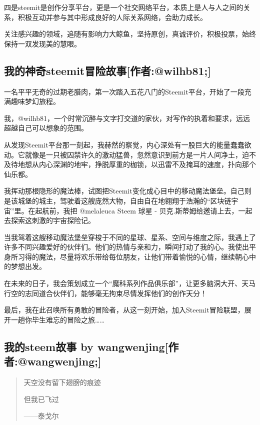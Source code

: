 \documentclass[]{ctexbook}
\begin{document}
四是steemit是创作分享平台，更是一个社交网络平台，本质上是人与人之间的关系，积极互动并参与其中形成良好的人际关系网络，会助力成长。

关注感兴趣的领域，追随有影响力大鲸鱼，坚持原创，真诚评价，积极投票，始终保持一双发现美的慧眼。

\hypertarget{steemitwilhb81}{%
\subsection{我的神奇steemit冒险故事{[}作者:@wilhb81;{]}}\label{steemitwilhb81}}

一名平平无奇的过期老腊肉，第一次踏入五花八门的Steemit平台，开始了一段充满趣味梦幻旅程。

我，@wilhb81，一个时常沉醉与文字打交道的家伙，对写作的执着和要求，远远超越自己可以想象的范围。

从发现Steemit平台那一刻起，我赫然的察觉，内心深处有一股巨大的能量蠢蠢欲动。它就像是一只被囚禁许久的激动猛兽，忽然意识到前方是一片人间净土，迫不及待地想从内心深渊的地牢，挣脱厚重的枷锁，以迅雷不及掩耳的速度，扑向那个仙乐都。

我挥动那根隐形的魔法棒，试图把Steemit变化成心目中的移动魔法堡垒。自己则是该城堡的城主，驾驶着这艘庞然大物，自由自在地翱翔于浩瀚的``区块链宇宙''里。在起航前，我把 @melaleuca Steem 球星 - 贝克.斯蒂姆给邀请上去，一起去探索这刺激的宇宙探险记。

当我驾着这艘移动魔法堡垒穿梭于不同的星球、星系、空间与维度之际，我遇上了许多不同兴趣爱好的伙伴们。他们的热情与亲和力，瞬间打动了我的心。我使出平身所习得的魔法，尽量将欢乐带给每位朋友，让他们带着愉悦的心情，继续朝心中的梦想出发。

在未来的日子，我会策划成立一个``魔科系列作品俱乐部''，让更多脑洞大开、天马行空的志同道合伙伴们，能够毫无拘束尽情发挥他们的创作天分！

最后，我在此召唤所有勇敢的冒险者，从这一刻开始，加入Steemit冒险联盟，展开一趟你毕生难忘的冒险之旅\ldots{}\ldots{}

\hypertarget{steem-by-wangwenjingwangwenjing}{%
\subsection{我的steem故事 by wangwenjing{[}作者:@wangwenjing;{]}}\label{steem-by-wangwenjingwangwenjing}}

\begin{quote}
天空没有留下翅膀的痕迹

但我已飞过

\begin{flushright}------泰戈尔\end{flushright}
\end{quote}
\end{document}
